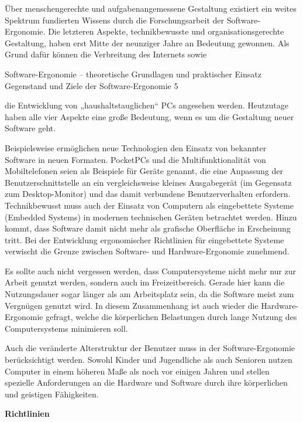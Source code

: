 \documentclass[a4paper, 12pt, twoside, BCOR=20mm, DIV=calc, abstracton, parskip=half*, toc=bibliography, toc=listof, headsepline, footsepline, headings=small, numbers=enddot]{scrreprt}
\begin{document}
Über menschengerechte und aufgabenangemessene Gestaltung existiert ein weites Spektrum fundierten Wissens durch die Forschungsarbeit der Software-Ergonomie. Die letzteren Aspekte, technikbewusste und organisationsgerechte Gestaltung, haben erst Mitte der neunziger Jahre an Bedeutung gewonnen. Als Grund dafür können die Verbreitung des Internets sowie

Software-Ergonomie – theoretische Grundlagen und praktischer Einsatz Gegenstand und Ziele der Software-Ergonomie 5

die Entwicklung von „haushaltstauglichen“ PCs angesehen werden. Heutzutage haben alle vier Aspekte eine große Bedeutung, wenn es um die Gestaltung neuer Software geht.

Beispielsweise ermöglichen neue Technologien den Einsatz von bekannter Software in neuen Formaten. PocketPCs und die Multifunktionalität von Mobiltelefonen seien als Beispiele für Geräte genannt, die eine Anpassung der Benutzerschnittstelle an ein vergleichsweise kleines Ausgabegerät (im Gegensatz zum Desktop-Monitor) und das damit verbundene Benutzerverhalten erfordern. Technikbewusst muss auch der Einsatz von Computern als eingebettete Systeme (Embedded Systems) in modernen technischen Geräten betrachtet werden. Hinzu kommt, dass Software damit nicht mehr als grafische Oberfläche in Erscheinung tritt. Bei der Entwicklung ergonomischer Richtlinien für eingebettete Systeme verwischt die Grenze zwischen Software- und Hardware-Ergonomie zunehmend.

Es sollte auch nicht vergessen werden, dass Computersysteme nicht mehr nur zur Arbeit genutzt werden, sondern auch im Freizeitbereich. Gerade hier kann die Nutzungsdauer sogar länger als am Arbeitsplatz sein, da die Software meist zum Vergnügen genutzt wird. In diesem Zusammenhang ist auch wieder die Hardware-Ergonomie gefragt, welche die körperlichen Belastungen durch lange Nutzung des Computersystems minimieren soll.

Auch die veränderte Alterstruktur der Benutzer muss in der Software-Ergonomie berücksichtigt werden. Sowohl Kinder und Jugendliche als auch Senioren nutzen Computer in einem höheren Maße als noch vor einigen Jahren und stellen spezielle Anforderungen an die Hardware und Software durch ihre körperlichen und geistigen Fähigkeiten.

\textbf{Richtlinien }
\end{document}
